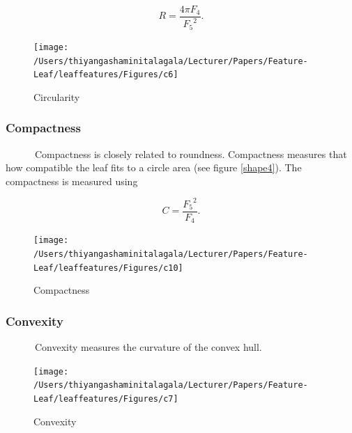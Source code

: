 \documentclass{article}
\begin{document}
\begin{equation}
    R = \frac{4 \pi F_4}{{F_5}^2}.
\label{calround}
\end{equation}

\begin{figure}[!ht]

{\centering \texttt{[image: /Users/thiyangashaminitalagala/Lecturer/Papers/Feature-Leaf/leaffeatures/Figures/c6]} 

}

\caption{\label{shape3}Circularity}\label{fig:unnamed-chunk-21}
\end{figure}

\hypertarget{compactness}{%
\subsubsection{Compactness}\label{compactness}}

~~~~~~Compactness is closely related to roundness. Compactness measures
that how compatible the leaf fits to a circle area (see figure
\ref{shape4}). The compactness is measured using

\begin{equation}
    C = \frac{{F_5}^2}{F_4}.
\label{calcompact}
\end{equation}

\begin{figure}[!ht]

{\centering \texttt{[image: /Users/thiyangashaminitalagala/Lecturer/Papers/Feature-Leaf/leaffeatures/Figures/c10]} 

}

\caption{\label{shape4}Compactness}\label{fig:unnamed-chunk-22}
\end{figure}

\hypertarget{convexity}{%
\subsubsection{Convexity}\label{convexity}}

~~~~~~Convexity measures the curvature of the convex hull.

\begin{figure}[!ht]

{\centering \texttt{[image: /Users/thiyangashaminitalagala/Lecturer/Papers/Feature-Leaf/leaffeatures/Figures/c7]} 

}

\caption{\label{shape7}Convexity}\label{fig:unnamed-chunk-23}
\end{figure}
\end{document}
